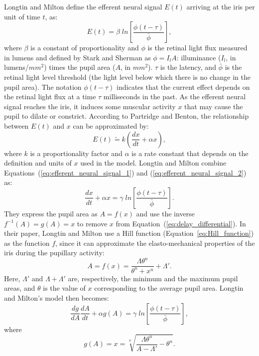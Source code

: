 \documentclass{acmtog} %
\begin{document}
Longtin and Milton define the efferent neural signal $E(t)$ arriving at the iris per unit of time $t$,
as:
\begin{equation}
\label{eq:et}
    E(t) = \beta \; {{ln}} \left[ \frac{ \phi(t-\tau) }{ \bar{\phi} } \right],
    \label{eq:efferent_neural_signal_1}
\end{equation}
where $\beta$ is a constant of proportionality and $\phi$ is the retinal
light flux measured in lumens and defined by Stark and Sherman as $\phi
= I_{l}A$: illuminance ($I_{l}$, in lumens/$mm^2$) times the pupil area
($A$, in $mm^2$). $\tau$ is the latency, and $\bar{\phi}$ is the retinal
light level threshold (the light level below which there is no change in
the pupil area). The notation $\phi(t-\tau)$ indicates that the current
effect depends on the retinal light flux at a time $\tau$ milliseconds
in the past. As the efferent neural signal reaches the iris, it induces
some muscular activity $x$ that may cause the pupil to dilate or
constrict. According to Partridge and Benton, the relationship between
$E(t)$ and $x$ can be approximated by:
\begin{equation}
E(t) \tilde{=} k \left( \frac{dx}{dt} + \alpha x \right),
    \label{eq:efferent_neural_signal_2}
\end{equation}
where $k$ is a proportionality factor and $\alpha$ is a rate constant
that depends on the definition and units of $x$ used in the model.
Longtin and Milton combine Equations~(\ref{eq:efferent_neural_signal_1})
and (\ref{eq:efferent_neural_signal_2}) as:
\begin{equation}
  \label{eq:ativ}
  \frac{dx}{dt} + \alpha x = \gamma \; {{ln}} \left[ \frac{ \phi(t-\tau) }{ \bar{\phi} } \right].
  \label{eq:delay_differential}
\end{equation}
They express the pupil area as $A = f(x)$ and use the inverse $f^{-1}(A)
= g(A) = x$ to remove $x$ from Equation~(\ref{eq:delay_differential}).
In their paper, Longtin and Milton use a Hill function \cite{Duc-2002}
(Equation~\ref{eq:Hill_function}) as the function $f$, since it can
approximate the elasto-mechanical properties of the iris during the
pupillary activity:
\begin{equation}
\label{eq:area}
  A = f(x) = \frac{\Lambda\theta^n}{\theta^n+x^n} + \Lambda'.
  \label{eq:Hill_function}
\end{equation}
Here, $\Lambda'$ and $\Lambda + \Lambda'$ are, respectively, the minimum
and the maximum pupil areas, and $\theta$ is the value of $x$
corresponding to the average pupil area. Longtin and Milton's model then
becomes:
\begin{equation}
  \frac{dg}{dA}\frac{dA}{dt} + \alpha g(A) = \gamma \; {{ln}} \left[ \frac{ \phi(t-\tau) }{ \bar{\phi} }
\right],
\label{eq:longtin}
\end{equation}
where
\begin{equation}
  g(A) = x = \sqrt[n]{ \frac {\Lambda \theta^n} { A - \Lambda'} - \theta^n }.
\label{eq:inverseHill}
\end{equation}
\end{document}
